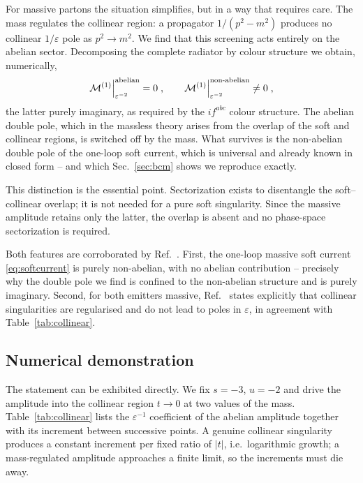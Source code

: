 \documentclass[11pt,a4paper]{article}
\newcommand{\eps}{\varepsilon}
\begin{document}
For massive partons the situation simplifies, but in a way that requires care.
The mass regulates the collinear region: a propagator $1/(p^2-m^2)$ produces no
collinear $1/\eps$ pole as $p^2\to m^2$. We find that this screening acts
 {entirely on the abelian sector}. Decomposing the complete radiator by
colour structure we obtain, numerically,
\begin{equation}
  \mathcal{M}^{(1)}\Big|^{\rm abelian}_{\eps^{-2}}=0\;,
  \qquad
  \mathcal{M}^{(1)}\Big|^{\rm non\text{-}abelian}_{\eps^{-2}}\neq0\;,
  \label{eq:noeps2}
\end{equation}
the latter purely imaginary, as required by the $if^{abc}$ colour structure. The
abelian double pole, which in the massless theory arises from the  {overlap}
of the soft and collinear regions, is switched off by the mass. What survives is
the non-abelian double pole of the one-loop soft current, which is universal and
already known in closed form  --  and which Sec.~\ref{sec:bcm} shows we reproduce
exactly.

This distinction is the essential point. Sectorization exists to disentangle the
soft--collinear  {overlap}; it is not needed for a pure soft singularity.
Since the massive amplitude retains only the latter, the overlap is absent and no
phase-space sectorization is required.

Both features are corroborated by Ref.~\cite{BCM}. First, the one-loop massive
soft current \eqref{eq:softcurrent} is purely non-abelian, with no abelian
contribution  --  precisely why the double pole we find is confined to the
non-abelian structure and is purely imaginary. Second, for both emitters massive,
Ref.~\cite{BCM} states explicitly that collinear singularities are regularised
and do not lead to poles in $\eps$, in agreement with Table~\ref{tab:collinear}.

\subsection{Numerical demonstration}
The statement can be exhibited directly. We fix $s=-3$, $u=-2$ and drive the
amplitude into the collinear region $t\to0$ at two values of the mass.
Table~\ref{tab:collinear} lists the $\eps^{-1}$ coefficient of the abelian
amplitude together with its increment between successive points. A genuine
collinear singularity produces a  {constant} increment per fixed ratio of
$|t|$, i.e.\ logarithmic growth; a mass-regulated amplitude approaches a finite
limit, so the increments must die away.
\end{document}
